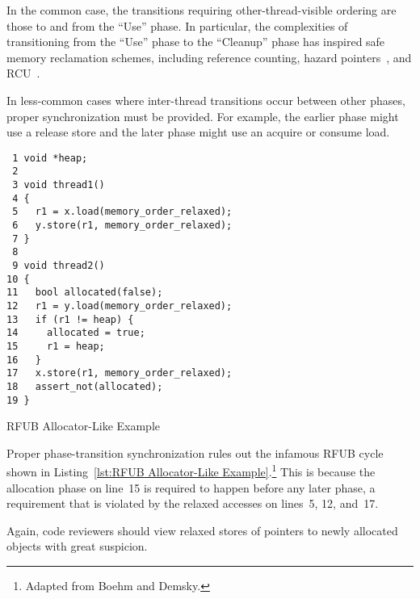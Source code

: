 \documentclass[10]{article}
\begin{document}
In the common case, the transitions requiring other-thread-visible ordering
are those to and from the ``Use'' phase.
In particular, the complexities of transitioning from the ``Use'' phase
to the ``Cleanup'' phase has inspired safe memory reclamation schemes,
including reference counting,
hazard pointers~\cite{Michael02a,HerlihyLM02,MagedMichael04a},
and RCU~\cite{McKenney98}.

In less-common cases where inter-thread transitions occur between other
phases, proper synchronization must be provided.
For example, the earlier phase might use a release store and
the later phase might use an acquire or consume load.

\begin{listing}[tbp]
\begin{verbatim}
 1 void *heap;
 2
 3 void thread1()
 4 {
 5   r1 = x.load(memory_order_relaxed);
 6   y.store(r1, memory_order_relaxed);
 7 }
 8
 9 void thread2()
10 {
11   bool allocated(false);
12   r1 = y.load(memory_order_relaxed);
13   if (r1 != heap) {
14     allocated = true;
15     r1 = heap;
16   }
17   x.store(r1, memory_order_relaxed);
18   assert_not(allocated);
19 }
\end{verbatim}
\caption{RFUB Allocator-Like Example}
\label{lst:RFUB Allocator-Like Example}
\end{listing}

Proper phase-transition synchronization rules out the infamous RFUB
cycle shown in Listing~\ref{lst:RFUB Allocator-Like Example}.\footnote{
	Adapted from Boehm and
	Demsky\cite[Figure 5]{Boehm:2014:OGA:2618128.2618134}.}
This is because the allocation phase on line~15 is required to happen
before any later phase, a requirement that is violated by the relaxed
accesses on lines~5, 12, and~17.

Again, code reviewers should view relaxed stores of pointers to newly
allocated objects with great suspicion.




\end{document}
